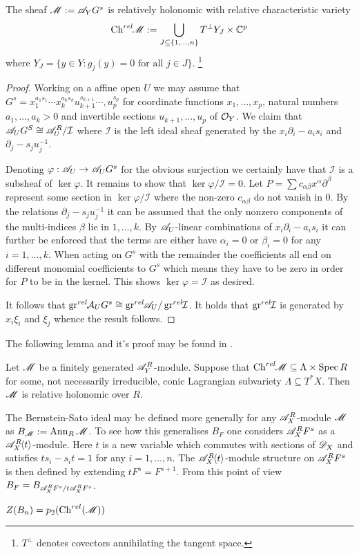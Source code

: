 \begin{lemma}
  The sheaf $\mathscr{M} := \mathscr{A}_Y G^s$ is relatively holonomic with relative characteristic variety
  $$\operatorname{Ch}^{rel}\mkern-5mu \mathscr{M} := \bigcup_{J\subseteq \{1,\ldots, n\}} T^\perp Y_J \times \mathbb{C}^p $$
  where $Y_J = \{y\in Y: g_j(y) = 0  \text{ for all }j\in J \}$. \footnote{$T^\perp$ denotes covectors annihilating the tangent space. }
\end{lemma}
\begin{proof}
  Working on a affine open $U$ we may assume that $G^s=x_1^{a_1s_1}\cdots x_k^{a_k s_k} u_{k+1}^{s_{k+1}} \cdots, u_{p}^{s_p}$ for coordinate functions $x_1,\ldots, x_p$, natural numbers $a_1,\ldots, a_k>0$ and invertible sections $u_{k+1},\ldots,u_{p}$ of $\mathcal{O}_Y$.
  We claim that $\mathscr{A}_U G^S \cong \mathscr{A}_U^R/\mathcal{I}$ where $\mathcal{I}$ is the left ideal sheaf generated by the $x_i\partial_i - a_is_i$ and $\partial_{j} - s_{j}u_j^{-1}$.

  Denoting $\varphi:\mathscr{A}_U \to \mathscr{A}_U G^s$ for the obvious surjection we certainly have that $\mathcal{I}$ is a subsheaf of $\ker \varphi$.
  It remains to show that $\ker\varphi / \mathcal{I} = 0$.
  Let $P=\sum c_{\alpha \beta} x^\alpha \partial^\beta$ represent some section in $\ker \varphi/\mathcal{I}$ where the non-zero $c_{\alpha \beta}$ do not vanish in $0$.
  By the relations $\partial_{j} - s_{j}u_j^{-1}$ it can be assumed that the only nonzero components of the multi-indices $\beta$ lie in $1,\ldots, k$.
  By $\mathscr{A}_U$-linear combinations of $x_i \partial_i - a_is_i$ it can further be enforced that the terms are either have $\alpha_i = 0$ or $\beta_i = 0$ for any $i=1,\ldots, k$. When acting on $G^s$ with the remainder the coefficients all end on different monomial coefficients to $G^s$ which means they have to be zero in order for $P$ to be in the kernel. This shows $\ker\varphi = \mathcal{I}$ as desired.

  It follows that $\operatorname{gr}^{rel}\mkern-5mu \mathcal{A}_UG^s \cong \operatorname{gr}^{rel}\mkern-5mu\mathscr{A}_U /\operatorname{gr}^{rel}\mkern-5mu \mathcal{I}$. It holds that $\operatorname{gr}^{rel}\mkern-5mu \mathcal{I}$ is generated by $x_i \xi_i$ and $\xi_j$ whence the result follows.
\end{proof}
The following lemma and it's proof may be found in \cite{maisonobe2016filtration}.
\begin{lemma}\label{lem: InclusionCharVar}
  Let $\mathscr{M}$ be a finitely generated $\mathscr{A}_Y^R$-module. Suppose that $\operatorname{Ch}^{rel}\mkern-5mu \mathscr{M} \subseteq \Lambda \times \operatorname{Spec} R$ for some, not necessarily irreducible, conic Lagrangian subvariety $\Lambda\subseteq T^*X$. Then $\mathscr{M}$ is relative holonomic over $R$.
\end{lemma}
The Bernstein-Sato ideal may be defined more generally for any $\mathscr{A}_X^R$-module $\mathscr{M}$ as $B_{\mathscr{M}} := \operatorname{Ann}_{R}\mathscr{M}$. To see how this generalises $B_F$ one considers $\mathscr{A}_X^R F^s$ as a $\mathscr{A}_X^R\mkern-5mu\left\langle t \right\rangle$-module.
Here $t$ is a new variable which commutes with sections of $\mathscr{D}_X$ and satisfies $ts_i - s_it = 1$ for any $i=1,\ldots, n$.  The $\mathscr{A}_X^R\mkern-5mu\left\langle t \right\rangle$-module structure on $\mathscr{A}_X^R F^s$ is then defined by extending $tF^s = F^{s + 1}$. From this point of view $B_F = B_{\mathscr{A}_X^R F^s / t\mathscr{A}_X^R F^s}$.
\begin{proposition}\label{prop: ProjectionBernsteinSatoRelativeChar}
  $Z(B_n) = p_2(\operatorname{Ch}^{rel}(\mathscr{M}))$
\end{proposition}

